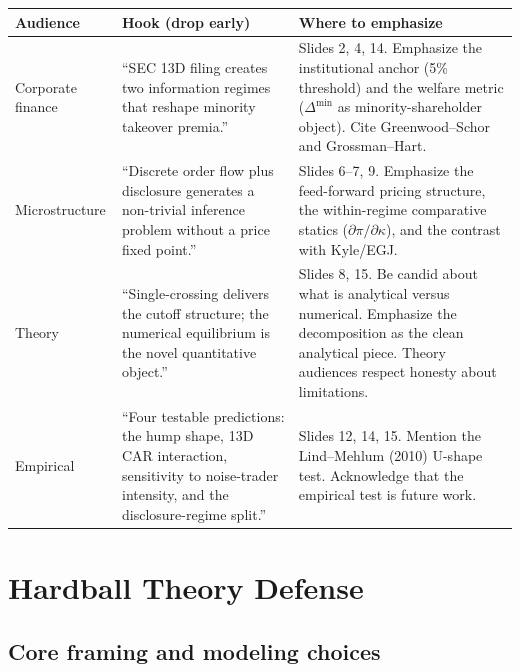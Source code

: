 \documentclass[9pt,a4paper]{extarticle}
\begin{document}
{\footnotesize
\begin{tabularx}{\textwidth}{@{}P{0.15\textwidth}P{0.22\textwidth}Y@{}}
\toprule
\textbf{Audience} & \textbf{Hook (drop early)} & \textbf{Where to emphasize} \\
\midrule
Corporate finance &
``SEC 13D filing creates two information regimes that reshape minority takeover premia.'' &
Slides 2, 4, 14. Emphasize the institutional anchor (5\% threshold) and the welfare metric ($\Delta^{\min}$ as minority-shareholder object). Cite Greenwood--Schor and Grossman--Hart. \\

Microstructure &
``Discrete order flow plus disclosure generates a non-trivial inference problem without a price fixed point.'' &
Slides 6--7, 9. Emphasize the feed-forward pricing structure, the within-regime comparative statics ($\partial\pi/\partial\kappa$), and the contrast with Kyle/EGJ. \\

Theory &
``Single-crossing delivers the cutoff structure; the numerical equilibrium is the novel quantitative object.'' &
Slides 8, 15. Be candid about what is analytical versus numerical. Emphasize the decomposition as the clean analytical piece. Theory audiences respect honesty about limitations. \\

Empirical &
``Four testable predictions: the hump shape, 13D CAR interaction, sensitivity to noise-trader intensity, and the disclosure-regime split.'' &
Slides 12, 14, 15. Mention the Lind--Mehlum (2010) U-shape test. Acknowledge that the empirical test is future work. \\
\bottomrule
\end{tabularx}
}

\section{Hardball Theory Defense}

\subsection{Core framing and modeling choices}
\end{document}
